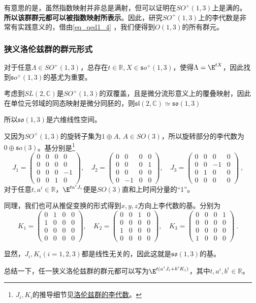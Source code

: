 有意思的是，虽然指数映射并非总是满射，但可以证明在$SO^+(1,3)$上是满的。
\textbf{所以该群群元都可以被指数映射所表示}。因此，研究$SO^+(1,3)$上的李代数是非常有实践意义的，借由\autoref{eq_qed1_4} ，我们便得到$O(1,3)$的所有群元。

\subsubsection{狭义洛伦兹群的群元形式}
对于任意$\Lambda\in SO^+(1,3)$，总存在$t\in \mathbb R,X\in \mathfrak so^+(1,3)$，使得$\Lambda=\E^{tX}$，因此找到$\mathfrak so^+(1,3)$的基尤为重要。

考虑到$SL(2,\mathbb C)$是$SO^+(1,3)$的双覆盖，且是微分流形意义上的覆叠映射，因此在单位元邻域的同态映射是微分同胚的，则$\mathfrak {sl}(2,\mathbb C)\simeq \mathfrak {so}(1,3)$

所以$\mathfrak{so}(1,3)$是六维线性空间。


又因为$SO^+(1,3)$的旋转子集为$1\oplus A,\,A\in SO(3)$，所以旋转部分的李代数为$0\oplus \mathfrak so(3)$。基分别是\footnote{$J_i,K_i$的推导细节见\href{https://wuli.wiki/online/lielot.html}{洛伦兹群的李代数}。}
\begin{equation}
J_{1}=\begin{pmatrix}0&0&0&0\\0&0&0&0\\0&0&0&-1\\0&0&1&0\end{pmatrix},\quad J_{2}=\begin{pmatrix}0&0&0&0\\0&0&0&1\\0&0&0&0\\0&-1&0&0\end{pmatrix},\quad J_{3}=\begin{pmatrix}0&0&0&0\\0&0&-1&0\\0&1&0&0\\0&0&0&0\end{pmatrix}~,
\end{equation}
对于任意$t,a^i\in\mathbb R$，$\E^{ta^iJ_i}$便是$SO(3)$直和上时间分量的“1”。

同理，我们也可从推促变换的形式得到$x,y,z$方向上李代数的基。分别为
\begin{equation}
K_1=\begin{pmatrix}0&1&0&0\\1&0&0&0\\0&0&0&0\\0&0&0&0\end{pmatrix},\quad K_2=\begin{pmatrix}0&0&1&0\\0&0&0&0\\1&0&0&0\\0&0&0&0\end{pmatrix},\quad K_3=\begin{pmatrix}0&0&0&1\\0&0&0&0\\0&0&0&0\\1&0&0&0\end{pmatrix}~.
\end{equation}

显然，$J_i,K_i(i=1,2,3)$都是线性无关的，因此这就是$\mathfrak{so}(1,3)$的基。

总结一下，任一狭义洛伦兹群的群元都可以写为$\E^{t(a^iJ_i+b^iK_i)}$，其中$t,a^i,b^i\in\mathbb R$。





